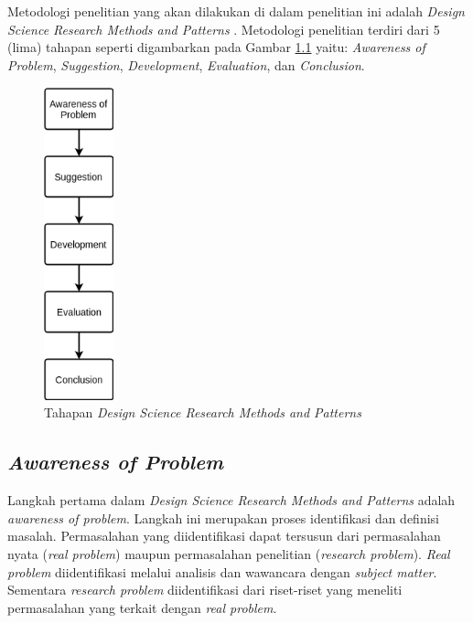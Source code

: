 \chapter{\babTiga}


Metodologi penelitian yang akan dilakukan di dalam penelitian ini adalah \textit{Design Science Research Methods and Patterns} \citep{vaishnavi_design_2007}. Metodologi penelitian terdiri dari 5 (lima) tahapan seperti digambarkan pada Gambar \ref{fig:design-science-research-methodology} yaitu: \textit{Awareness of Problem}, \textit{Suggestion}, \textit{Development}, \textit{Evaluation}, dan \textit{Conclusion}.


\begin{figure}[h]
	\centering
	\includegraphics[width=2cm]{Resources/Images/design-science-research-methodology}
	\captionsetup{format=hang}
	\caption{Tahapan \textit{Design Science Research Methods and Patterns}}
	\label{fig:design-science-research-methodology}
\end{figure}


\section{\textit{Awareness of Problem}}
Langkah pertama dalam \textit{Design Science Research Methods and Patterns} adalah \textit{awareness of problem}. Langkah ini merupakan proses identifikasi dan definisi masalah. Permasalahan yang diidentifikasi dapat tersusun dari permasalahan nyata (\textit{real problem}) maupun permasalahan penelitian (\textit{research problem}). \textit{Real problem} diidentifikasi melalui analisis dan wawancara dengan \textit{subject matter}. Sementara \textit{research problem} diidentifikasi dari riset-riset yang meneliti permasalahan yang terkait dengan \textit{real problem}.


